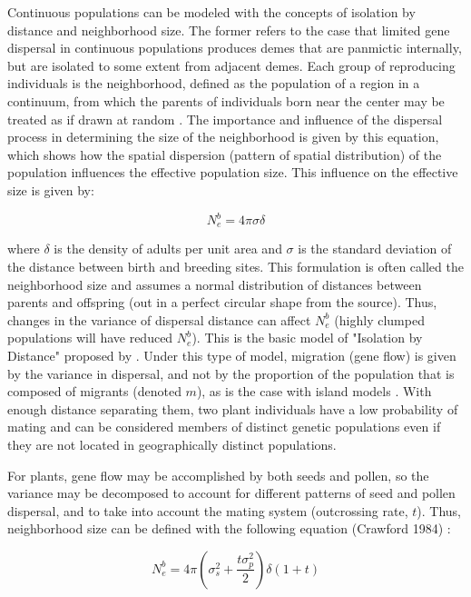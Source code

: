 \documentclass[a4paper, 12pt]{article}
\begin{document}
\begin{linenumbers}
Continuous populations can be modeled with the concepts of isolation by distance and neighborhood size\citep{Wright:1943aa,Wright:1946aa}. The former refers to the case that limited gene dispersal in continuous populations produces demes that are panmictic internally, but are isolated to some extent from adjacent demes. Each group of reproducing individuals is the neighborhood, defined as the population of a region in a continuum, from which the parents of individuals born near the center may be treated as if drawn at random \citep{Wright:1969mb}. The importance and influence of the dispersal process in determining the size of the neighborhood is given by this equation, which shows how the spatial dispersion (pattern of spatial distribution) of the population influences the effective population size. This influence on the effective size is given by:  

\begin{equation}
					N^b_e= 4 \pi \sigma \delta
\end{equation}

where $\delta$ is the density of adults per unit area and $\sigma$ is the standard deviation of the distance between birth and breeding sites. This formulation is often called the neighborhood size and assumes a normal distribution of distances between parents and offspring (out in a perfect circular shape from the source). Thus, changes in the variance of dispersal distance can affect $N^b_e$ (highly clumped populations will have reduced $N^b_e$). This is the basic model of "Isolation by Distance" proposed by   \citet{Wright:1943aa,Wright:1946aa}. Under this type of model, migration (gene flow) is given by the variance in dispersal, and not by the proportion of the population that is composed of migrants (denoted $m$), as is the case with island models \citep{Slatkin:1985qb}. With enough distance separating them, two plant individuals have a low probability of mating and can be considered members of distinct genetic populations even if they are not located in geographically distinct populations.

For plants, gene flow may be accomplished by both seeds and pollen, so the variance may be decomposed to account for different patterns of seed and pollen dispersal, and to take into account the mating system (outcrossing rate, $t$). Thus, neighborhood size can be defined with the following equation (Crawford 1984) :

\begin{equation}
  		N^b_e = 4 \pi (\sigma^2_s + \frac{t \sigma^2_p}{2}) \delta (1 + t)
\end{equation}


\end{linenumbers}
\end{document}
